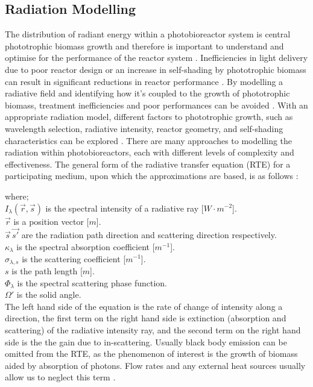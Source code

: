\subsection{Radiation Modelling}
\label{S:radiation}
The distribution of radiant energy within a photobioreactor system is central phototrophic biomass growth and therefore is important to understand and optimise for the performance of the reactor system \cite{kong2014}. Inefficiencies in light delivery due to poor reactor design or an increase in self-shading by phototrophic biomass can result in significant reductions in reactor performance \cite{nwoba2019}. By modelling a radiative field and identifying how it's coupled to the growth of phototrophic biomass, treatment inefficiencies and poor performances can be avoided \cite{nwoba2019}. With an appropriate radiation model, different factors to phototrophic growth, such as wavelength selection, radiative intensity, reactor geometry, and self-shading characteristics can be explored \cite{nwoba2019}.
\skippingparagraph
There are many approaches to modelling the radiation within photobioreactors, each with different levels of complexity and effectiveness. The general form of the radiative transfer equation (RTE) for a participating medium, upon which the approximations are based, is as follows \cite{modest2003}:



where;\\
$I_\lambda (\vec{r}, \vec{s})$ is the spectral intensity of a radiative ray [$W \cdot m^{-2}$]. \\
$\vec{r}$ is a position vector [$m$]. \\
$\vec{s} \, \vec{s'}$ are the radiation path direction and scattering direction respectively.\\
$\kappa_\lambda$ is the spectral absorption coefficient [$m^{-1}$]. \\
$\sigma_{\lambda, s}$ is the scattering coefficient [$m^{-1}$].  \\
$s$ is the path length [$m$]. \\
$\Phi_\lambda$ is the spectral scattering phase function. \\
$\Omega'$ is the solid angle. \\

The left hand side of the equation is the rate of change of intensity along a direction, the first term on the right hand side is extinction (absorption and scattering) of the radiative intensity ray, and the second term on the right hand side is the the gain due to in-scattering. Usually black body emission can be omitted from the RTE, as the phenomenon of interest is the growth of biomass aided by absorption of photons. Flow rates and any external heat sources usually allow us to neglect this term \cite{lee1994}.


